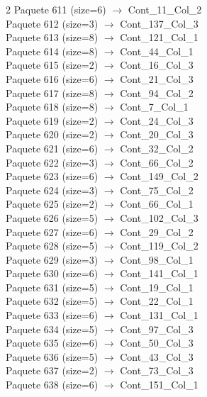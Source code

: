 \begin{multicols}{2}
Paquete 611 (size=6) $\rightarrow$ Cont\_11\_Col\_2\\
Paquete 612 (size=3) $\rightarrow$ Cont\_137\_Col\_3\\
Paquete 613 (size=8) $\rightarrow$ Cont\_121\_Col\_1\\
Paquete 614 (size=8) $\rightarrow$ Cont\_44\_Col\_1\\
Paquete 615 (size=2) $\rightarrow$ Cont\_16\_Col\_3\\
Paquete 616 (size=6) $\rightarrow$ Cont\_21\_Col\_3\\
Paquete 617 (size=8) $\rightarrow$ Cont\_94\_Col\_2\\
Paquete 618 (size=8) $\rightarrow$ Cont\_7\_Col\_1\\
Paquete 619 (size=2) $\rightarrow$ Cont\_24\_Col\_3\\
Paquete 620 (size=2) $\rightarrow$ Cont\_20\_Col\_3\\
Paquete 621 (size=6) $\rightarrow$ Cont\_32\_Col\_2\\
Paquete 622 (size=3) $\rightarrow$ Cont\_66\_Col\_2\\
Paquete 623 (size=6) $\rightarrow$ Cont\_149\_Col\_2\\
Paquete 624 (size=3) $\rightarrow$ Cont\_75\_Col\_2\\
Paquete 625 (size=2) $\rightarrow$ Cont\_66\_Col\_1\\
Paquete 626 (size=5) $\rightarrow$ Cont\_102\_Col\_3\\
Paquete 627 (size=6) $\rightarrow$ Cont\_29\_Col\_2\\
Paquete 628 (size=5) $\rightarrow$ Cont\_119\_Col\_2\\
Paquete 629 (size=3) $\rightarrow$ Cont\_98\_Col\_1\\
Paquete 630 (size=6) $\rightarrow$ Cont\_141\_Col\_1\\
Paquete 631 (size=5) $\rightarrow$ Cont\_19\_Col\_1\\
Paquete 632 (size=5) $\rightarrow$ Cont\_22\_Col\_1\\
Paquete 633 (size=6) $\rightarrow$ Cont\_131\_Col\_1\\
Paquete 634 (size=5) $\rightarrow$ Cont\_97\_Col\_3\\
Paquete 635 (size=6) $\rightarrow$ Cont\_50\_Col\_3\\
Paquete 636 (size=5) $\rightarrow$ Cont\_43\_Col\_3\\
Paquete 637 (size=2) $\rightarrow$ Cont\_73\_Col\_3\\
Paquete 638 (size=6) $\rightarrow$ Cont\_151\_Col\_1\\

\end{multicols}
